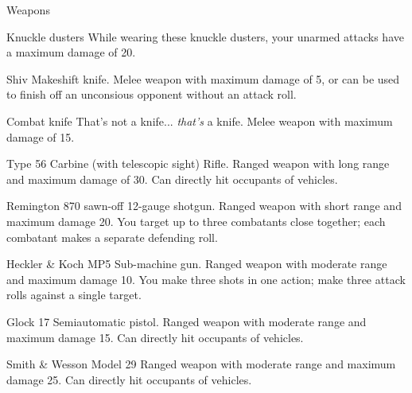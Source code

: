 
\begin{abstractsection}{Weapons}
\vspace{1ex}

\begin{describe}{Knuckle dusters}
  While wearing these knuckle dusters, your unarmed attacks have a maximum damage of 20.
\end{describe}

\begin{describe}{Shiv}
  Makeshift knife. Melee weapon with maximum damage of 5, or can be used to finish off an unconsious opponent without an attack roll.
\end{describe}

\begin{describe}{Combat knife}
  That's not a knife... \emph{that's} a knife. Melee weapon with maximum damage of 15.
\end{describe}

\begin{describe}{Type 56 Carbine (with telescopic sight)}
  Rifle. Ranged weapon with long range and maximum damage of 30. Can directly hit occupants of vehicles.
\end{describe}

\begin{describe}{Remington 870 sawn-off}
  12-gauge shotgun. Ranged weapon with short range and maximum damage 20. You target up to three combatants close together; each combatant makes a separate defending roll.
\end{describe}

\begin{describe}{Heckler \& Koch MP5}
  Sub-machine gun. Ranged weapon with moderate range and maximum damage 10. You make three shots in one action; make three attack rolls against a single target.
\end{describe}

\begin{describe}{Glock 17}
  Semiautomatic pistol. Ranged weapon with moderate range and maximum damage 15. Can directly hit occupants of vehicles.
\end{describe}

\begin{describe}{Smith \& Wesson Model 29}
  Ranged weapon with moderate range and maximum damage 25. Can directly hit occupants of vehicles.
\end{describe}
\end{abstractsection}

